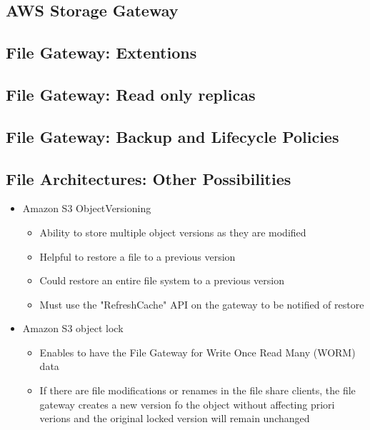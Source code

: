 {\subsection{AWS Storage Gateway}

\subsection{File Gateway: Extentions}

\subsection{File Gateway: Read only replicas}

\subsection{File Gateway: Backup and Lifecycle Policies}

\subsection{File Architectures: Other Possibilities}
\begin{itemize}
    \item Amazon S3 ObjectVersioning
    \begin{itemize}
        \item Ability to store multiple object versions as they are modified
        \item Helpful to restore a file to a previous version
        \item Could restore an entire file system to a previous version
        \item Must use the "RefreshCache" API on the gateway to be notified of restore
    \end{itemize}

    \item Amazon S3 object lock
    \begin{itemize}
        \item Enables to have the File Gateway for Write Once Read Many (WORM) data
        \item If there are file modifications or renames in the file share clients, the file gateway creates a new version fo the object without affecting priori verions and the original locked version will remain unchanged
    \end{itemize}
\end{itemize}


}

